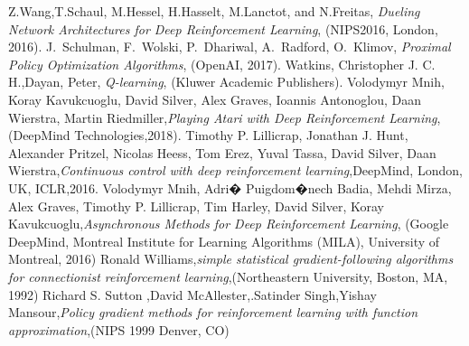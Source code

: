 \documentclass[journal,onecolumn]{IEEEtran}
\begin{document}
\begin{thebibliography}{}\label{sec:TeXbooks}
 Z.Wang,T.Schaul, M.Hessel, H.Hasselt, M.Lanctot, and N.Freitas, \textit{Dueling Network Architectures for Deep Reinforcement Learning}, (NIPS2016, London, 2016).
 J.~Schulman, F.~Wolski, P.~Dhariwal, A.~Radford, O.~Klimov, \textit{Proximal Policy Optimization Algorithms}, (OpenAI, 2017).
 Watkins, Christopher J. C. H.,Dayan, Peter, \textit{Q-learning}, (Kluwer Academic Publishers).
Volodymyr Mnih, Koray Kavukcuoglu, David Silver, Alex Graves, Ioannis Antonoglou, Daan Wierstra, Martin Riedmiller,\textit{Playing Atari with Deep Reinforcement Learning},(DeepMind Technologies,2018).
Timothy P. Lillicrap, Jonathan J. Hunt, Alexander Pritzel, Nicolas Heess, Tom Erez, Yuval Tassa, David Silver, Daan Wierstra,\textit{Continuous control with deep reinforcement learning},{DeepMind, London, UK, ICLR,2016}.
Volodymyr Mnih, Adri� Puigdom�nech Badia, Mehdi Mirza, Alex Graves, Timothy P. Lillicrap, Tim Harley, David Silver, Koray Kavukcuoglu,\textit{Asynchronous Methods for Deep Reinforcement Learning}, (Google DeepMind, Montreal Institute for Learning Algorithms (MILA), University of Montreal, 2016)
Ronald Williams,\textit{simple statistical gradient-following algorithms for connectionist reinforcement learning},(Northeastern University, Boston, MA, 1992)
Richard S. Sutton	,David McAllester,.Satinder Singh,Yishay Mansour,\textit{Policy gradient methods for reinforcement learning with function approximation},(NIPS 1999 Denver, CO)

\end{thebibliography}
\end{document}
